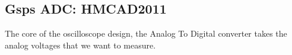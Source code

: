 \subsection{Gsps ADC: HMCAD2011}
	The core of the oscilloscope design, the Analog To Digital converter takes the analog voltages that we want to measure.